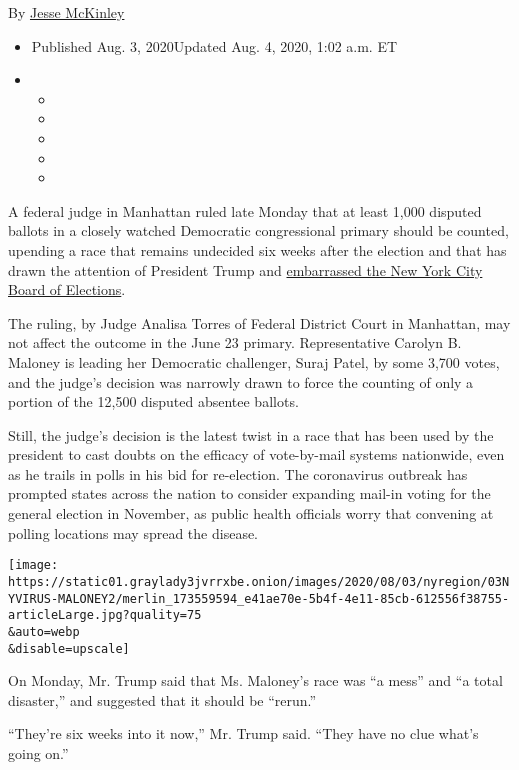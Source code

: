 By \href{https://www.nytimes3xbfgragh.onion/by/jesse-mckinley}{Jesse
McKinley}

\begin{itemize}
\item
  Published Aug. 3, 2020Updated Aug. 4, 2020, 1:02 a.m. ET
\item
  \begin{itemize}
  \item
  \item
  \item
  \item
  \item
  \end{itemize}
\end{itemize}

A federal judge in Manhattan ruled late Monday that at least 1,000
disputed ballots in a closely watched Democratic congressional primary
should be counted, upending a race that remains undecided six weeks
after the election and that has drawn the attention of President Trump
and
\href{https://www.nytimes3xbfgragh.onion/2020/08/03/nyregion/nyc-mail-ballots-voting.html}{embarrassed
the New York City Board of Elections}.

The ruling, by Judge Analisa Torres of Federal District Court in
Manhattan, may not affect the outcome in the June 23 primary.
Representative Carolyn B. Maloney is leading her Democratic challenger,
Suraj Patel, by some 3,700 votes, and the judge's decision was narrowly
drawn to force the counting of only a portion of the 12,500 disputed
absentee ballots.

Still, the judge's decision is the latest twist in a race that has been
used by the president to cast doubts on the efficacy of vote-by-mail
systems nationwide, even as he trails in polls in his bid for
re-election. The coronavirus outbreak has prompted states across the
nation to consider expanding mail-in voting for the general election in
November, as public health officials worry that convening at polling
locations may spread the disease.

\texttt{[image: https://static01.graylady3jvrrxbe.onion/images/2020/08/03/nyregion/03NYVIRUS-MALONEY2/merlin\_173559594\_e41ae70e-5b4f-4e11-85cb-612556f38755-articleLarge.jpg?quality=75\\\&auto=webp\\\&disable=upscale]}

On Monday, Mr. Trump said that Ms. Maloney's race was ``a mess'' and ``a
total disaster,'' and suggested that it should be ``rerun.''

``They're six weeks into it now,'' Mr. Trump said. ``They have no clue
what's going on.''

